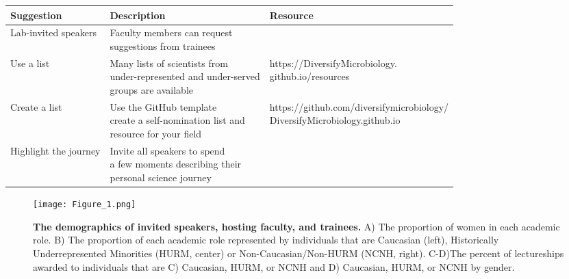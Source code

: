 \documentclass[10pt,]{article}
\begin{document}
\begin{center}
\small
\begin{tabular}{|l|l|l|}
\hline

\rowcolor{lightgray}
\textbf{Suggestion} & \textbf{Description} & \textbf{Resource} \\ \hline

Lab-invited speakers & \makecell[l]{Faculty members can request \\suggestions from trainees} & \\ \hline

Use a list & \makecell[l]{Many lists of scientists from \\under-represented and under-served \\groups are available} &  \makecell[l]{https://DiversifyMicrobiology.\\github.io/resources}\\ \hline

Create a list & \makecell[l]{Use the GitHub template \\ create a self-nomination list and \\resource for your field} & \makecell[l]{https://github.com/diversifymicrobiology/\\DiversifyMicrobiology.github.io} \\ \hline

Highlight the journey & \makecell[l]{Invite all speakers to spend \\a few moments describing their \\personal science journey} & \\ \hline

\end{tabular}
\end{center}

\begin{figure}
\centering
\texttt{[image: Figure\_1.png]}
\caption{\textbf{The demographics of invited speakers, hosting faculty,
and trainees.} A) The proportion of women in each academic role. B) The
proportion of each academic role represented by individuals that are
Caucasian (left), Historically Underrepresented Minorities (HURM,
center) or Non-Caucasian/Non-HURM (NCNH, right). C-D)The percent of
lectureships awarded to individuals that are C) Caucasian, HURM, or NCNH
and D) Caucasian, HURM, or NCNH by gender.}
\end{figure}

\newpage
\end{document}
